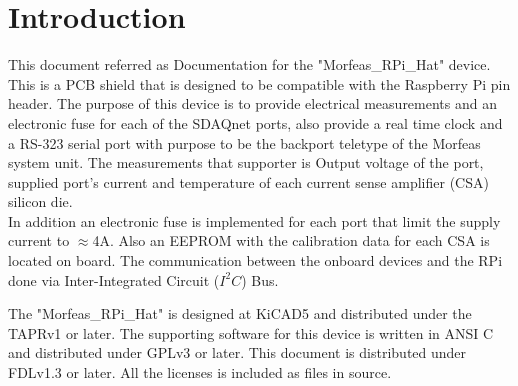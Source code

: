 \section{Introduction}
This document referred as Documentation for the "Morfeas\_RPi\_Hat" device. This is a PCB shield that is designed to be compatible with the Raspberry Pi pin header.
The purpose of this device is to provide electrical measurements and an electronic fuse for each of the SDAQnet ports, also provide a real time clock and 
a RS-323 serial port with purpose to be the backport teletype of the Morfeas system unit. 
The measurements that supporter is Output voltage of the port, supplied port's current and temperature of each current sense amplifier (CSA) silicon die.\\
In addition an electronic fuse is implemented for each port that limit the supply current to $\approx$4A.
Also an EEPROM with the calibration data for each CSA is located on board. The communication between the onboard devices and the RPi done
via Inter-Integrated Circuit ($I^2C$) Bus.

The "Morfeas\_RPi\_Hat" is designed at KiCAD5 and distributed under the TAPRv1 or later. 
The supporting software for this device is written in ANSI C and distributed under GPLv3 or later. 
This document is distributed under FDLv1.3 or later.
All the licenses is included as files in source.